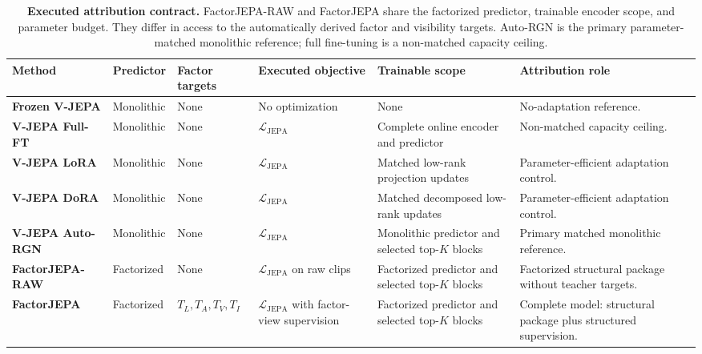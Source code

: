 \begin{table}[t]
\centering
\caption{
\textbf{Executed attribution contract.}
FactorJEPA-RAW and FactorJEPA share the factorized predictor, trainable encoder
scope, and parameter budget. They differ in access to the
automatically derived factor and visibility targets. Auto-RGN is the primary
parameter-matched monolithic reference; full fine-tuning is a
non-matched capacity ceiling.
}
\label{tab:executed_contract}
\scriptsize
\setlength{\tabcolsep}{4pt}
\renewcommand{\arraystretch}{1.15}

\begin{tabularx}{\textwidth}{
    p{}
    p{}
    p{}
    p{}
    p{}
    X
}
\toprule
\textbf{Method}
&
\textbf{Predictor}
&
\textbf{Factor targets}
&
\textbf{Executed objective}
&
\textbf{Trainable scope}
&
\textbf{Attribution role}
\\
\midrule

\rowcolor{AttrGray}
\textbf{Frozen V-JEPA}
&
Monolithic
&
None
&
No optimization
&
None
&
No-adaptation reference.
\\

\textbf{V-JEPA Full-FT}
&
Monolithic
&
None
&
\(\mathcal L_{\mathrm{JEPA}}\)
&
Complete online encoder and predictor
&
Non-matched capacity ceiling.
\\

\textbf{V-JEPA LoRA}
&
Monolithic
&
None
&
\(\mathcal L_{\mathrm{JEPA}}\)
&
Matched low-rank projection updates
&
Parameter-efficient adaptation control.
\\

\textbf{V-JEPA DoRA}
&
Monolithic
&
None
&
\(\mathcal L_{\mathrm{JEPA}}\)
&
Matched decomposed low-rank updates
&
Parameter-efficient adaptation control.
\\

\rowcolor{AttrBlue}
\textbf{V-JEPA Auto-RGN}
&
Monolithic
&
None
&
\(\mathcal L_{\mathrm{JEPA}}\)
&
Monolithic predictor and selected top-\(K\) blocks
&
Primary matched monolithic reference.
\\

\rowcolor{AttrGold}
\textbf{FactorJEPA-RAW}
&
Factorized
&
None
&
\(\mathcal L_{\mathrm{JEPA}}\) on raw clips
&
Factorized predictor and selected top-\(K\) blocks
&
Factorized structural package without teacher targets.
\\

\rowcolor{AttrTeal}
\textbf{FactorJEPA}
&
Factorized
&
\(T_L,T_A,T_V,T_I\)
&
\(\mathcal L_{\mathrm{JEPA}}\) with factor-view supervision
&
Factorized predictor and selected top-\(K\) blocks
&
Complete model: structural package plus structured supervision.
\\


\end{tabularx}
\end{table}
